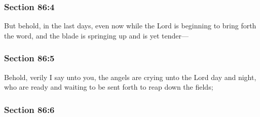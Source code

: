 
	\subsubsection{Section 86:4} %
		\label{DC86-4}

		But behold, in the last days, even now while the Lord is beginning to bring forth the word, and the blade is springing up and is yet tender---


	\subsubsection{Section 86:5} %
		\label{DC86-5}

		Behold, verily I say unto you, the angels are crying unto the Lord day and night, who are ready and waiting to be sent forth to reap down the fields;


	\subsubsection{Section 86:6} %
		\label{DC86-6}

